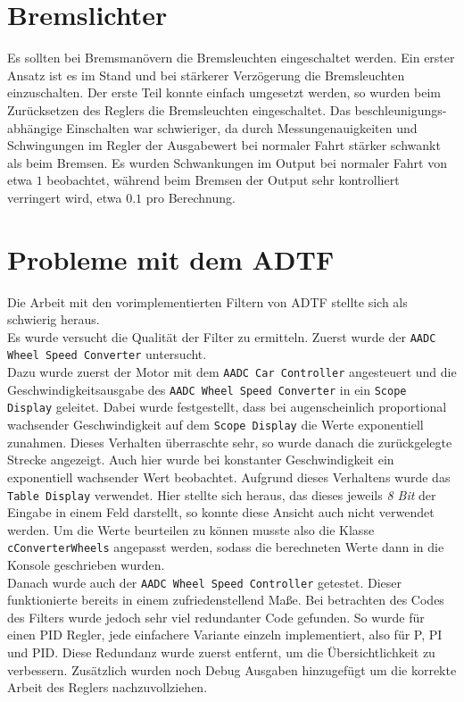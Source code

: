\documentclass[a4paper,12pt]{report}
\begin{document}
\section{Bremslichter}
	Es sollten bei Bremsmanövern die Bremsleuchten eingeschaltet werden.
	Ein erster Ansatz ist es im Stand und bei stärkerer Verzögerung die Bremsleuchten einzuschalten.
	Der erste Teil konnte einfach umgesetzt werden, so wurden beim Zurücksetzen des Reglers die Bremsleuchten eingeschaltet.
	Das beschleunigungs-abhängige Einschalten war schwieriger, da durch Messungenauigkeiten und Schwingungen im Regler der Ausgabewert bei normaler Fahrt stärker schwankt als beim Bremsen.
	Es wurden Schwankungen im Output bei normaler Fahrt von etwa $1$ beobachtet, während beim Bremsen der Output sehr kontrolliert verringert wird, etwa $0.1$ pro Berechnung.

\section{Probleme mit dem ADTF}
	Die Arbeit mit den vorimplementierten Filtern von ADTF stellte sich als schwierig heraus. \\
	Es wurde versucht die Qualität der Filter zu ermitteln.
	Zuerst wurde der \texttt{AADC Wheel Speed Converter} untersucht. \\
	Dazu wurde zuerst der Motor mit dem \texttt{AADC Car Controller} angesteuert und die Geschwindigkeitsausgabe des \texttt{AADC Wheel Speed Converter} in ein \texttt{Scope Display} geleitet.
	Dabei wurde festgestellt, dass bei augenscheinlich proportional wachsender Geschwindigkeit auf dem \texttt{Scope Display} die Werte exponentiell zunahmen.
	Dieses Verhalten überraschte sehr, so wurde danach die zurückgelegte Strecke angezeigt.
	Auch hier wurde bei konstanter Geschwindigkeit ein exponentiell wachsender Wert beobachtet.
	Aufgrund dieses Verhaltens wurde das \texttt{Table Display} verwendet.
	Hier stellte sich heraus, das dieses jeweils \emph{8 Bit} der Eingabe in einem Feld darstellt, so konnte diese Ansicht auch nicht verwendet werden.
	Um die Werte beurteilen zu können musste also die Klasse \texttt{cConverterWheels} angepasst werden, sodass die berechneten Werte dann in die Konsole geschrieben wurden. \\
	Danach wurde auch der \texttt{AADC Wheel Speed Controller} getestet.
	Dieser funktionierte bereits in einem zufriedenstellend Maße.
	Bei betrachten des Codes des Filters wurde jedoch sehr viel redundanter Code gefunden.
	So wurde für einen PID Regler, jede einfachere Variante einzeln implementiert, also für P, PI und PID.
	Diese Redundanz wurde zuerst entfernt, um die Übersichtlichkeit zu verbessern.
	Zusätzlich wurden noch Debug Ausgaben hinzugefügt um die korrekte Arbeit des Reglers nachzuvollziehen. \\
\end{document}
